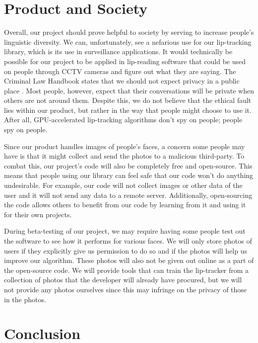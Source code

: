 \section{Product and Society}
Overall, our project should prove helpful to society by serving to increase people's linguistic diversity. We can, unfortunately, see a nefarious use for our lip-tracking library, which is its use in surveillance applications. It would technically be possible for our project to be applied in lip-reading software that could be used on people through CCTV cameras and figure out what they are saying. The Criminal Law Handbook states that we should not expect privacy in a public place \cite{criminal-law}. Most people, however, expect that their conversations will be private when others are not around them. Despite this, we do not believe that the ethical fault lies within our product, but rather in the way that people might choose to use it. After all, GPU-accelerated lip-tracking algorithms don't spy on people; people spy on people. 

Since our product handles images of people's faces, a concern some people may have is that it might collect and send the photos to a malicious third-party. To combat this, our project's code will also be completely free and open-source. This means that people using our library can feel safe that our code won't do anything undesirable. For example, our code will not collect images or other data of the user and it will not send any data to a remote server. Additionally, open-sourcing the code allows others to benefit from our code by learning from it and using it for their own projects. 

During beta-testing of our project, we may require having some people test out the software to see how it performs for various faces. We will only store photos of users if they explicitly give us permission to do so and if the photos will help us improve our algorithm. These photos will also not be given out online as a part of the open-source code. We will provide tools that can train the lip-tracker from a collection of photos that the developer will already have procured, but we will not provide any photos ourselves since this may infringe on the privacy of those in the photos. 

\section{Conclusion}

